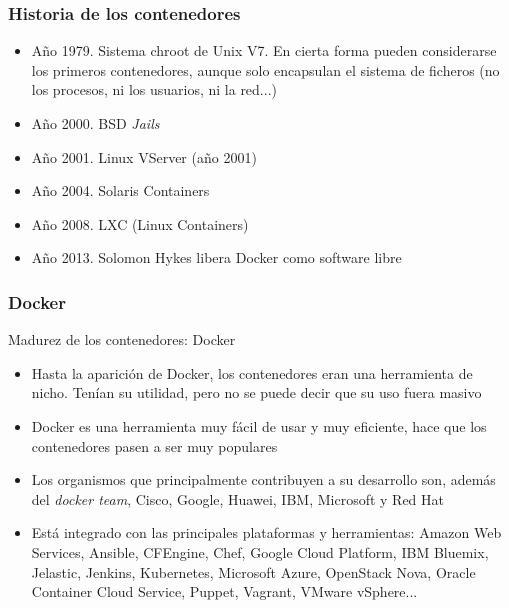 \documentclass[ucs]{beamer}
\begin{document}
\begin{frame}[fragile]
\frametitle{Historia de los contenedores}



\begin{itemize}
\item
Año 1979. Sistema chroot de Unix V7. En cierta forma pueden considerarse los primeros
contenedores, aunque solo encapsulan el sistema de ficheros (no los procesos, ni los usuarios,
ni la red...)

\item
Año 2000. BSD \emph{Jails} 

\item
Año 2001. Linux VServer (año 2001)

\item
Año 2004. Solaris Containers

\item
Año 2008. LXC (Linux Containers)

\item
Año 2013. Solomon Hykes libera Docker como software libre

\end{itemize}

\end{frame}




\begin{frame}[fragile]
\frametitle{Docker}

Madurez de los contenedores: Docker 


\begin{itemize}
\item
Hasta la aparición de Docker, los contenedores eran una herramienta de nicho.
Tenían su utilidad, pero no se puede decir que su uso fuera masivo
\item
Docker es una herramienta muy fácil de usar y muy eficiente, hace que los contenedores
pasen a ser muy populares

\item
Los organismos que principalmente contribuyen a su desarrollo son, además del \emph{docker team}, 
 Cisco, Google, Huawei, IBM, Microsoft y Red Hat
\item
Está integrado con las principales plataformas y herramientas:
 Amazon Web Services, Ansible, CFEngine, Chef, Google Cloud Platform, IBM Bluemix, Jelastic, Jenkins, Kubernetes,
Microsoft Azure, OpenStack Nova, Oracle Container Cloud Service, Puppet, Vagrant, VMware vSphere...


\end{itemize}

\end{frame}
\end{document}
